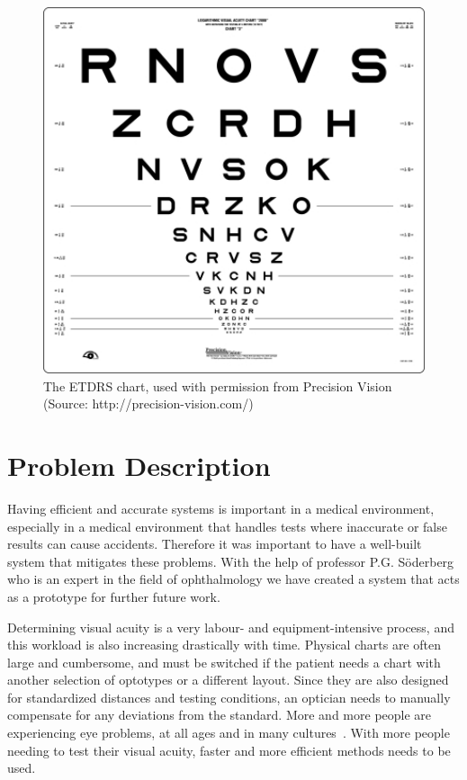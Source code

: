 \documentclass[12pt,a4paper,notitlepage]{report}
\begin{document}
\begin{figure}[ht!]
\centering
\includegraphics[width=120mm]{images/etdrs_chart.jpg}
\caption[The ETDRS chart]{The ETDRS chart, used with permission from Precision Vision \\ (Source: http://precision-vision.com/)\label{fig:etdrs_chart1}}
\end{figure} 

\chapter{ Problem Description}%
Having efficient and accurate systems is important in a medical environment, especially in a medical environment that handles tests where inaccurate or false results can cause accidents. Therefore it was important to have a well-built system that mitigates these problems. With the help of professor P.G. Söderberg who is an expert in the field of ophthalmology we have created a system that acts as a prototype for further future work. 

Determining visual acuity is a very labour- and equipment-intensive process, and this workload is also increasing drastically with time. Physical charts are often large and cumbersome, and must be switched if the patient needs a chart with another selection of optotypes or a different layout. Since they are also designed for standardized distances and testing conditions, an optician needs to manually compensate for any deviations from the standard. More and more people are experiencing eye problems, at all ages and in many cultures~\cite{vision_loss}. With more people needing to test their visual acuity, faster and more efficient methods needs to be used.
\end{document}
